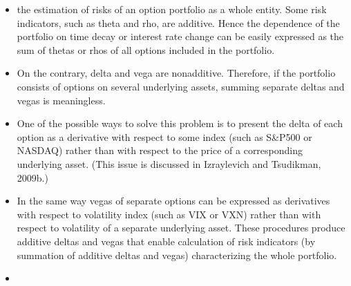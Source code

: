 \begin{itemize}
            \item the estimation of risks of an option portfolio as a whole entity. Some risk indicators, such as theta and rho, are additive. Hence the dependence of the portfolio on time decay or interest rate change can be easily expressed as the sum of thetas or rhos of all options included in the portfolio.
            \item On the contrary, delta and vega are nonadditive. Therefore, if the portfolio consists of options on several underlying assets, summing separate deltas and vegas is meaningless.
            \item One of the possible ways to solve this problem is to present the delta of each option as a derivative with respect to some index (such as S\&P500 or NASDAQ) rather than with respect to the price of a corresponding underlying asset. (This issue is discussed in Izraylevich and Tsudikman, 2009b.)
            \item In the same way vegas of separate options can be expressed as derivatives with respect to volatility index (such as VIX or VXN) rather than with respect to volatility of a separate underlying asset. These procedures produce additive deltas and vegas that enable calculation of risk indicators (by summation of additive deltas and vegas) characterizing the whole portfolio.
            \item
        \end{itemize}

